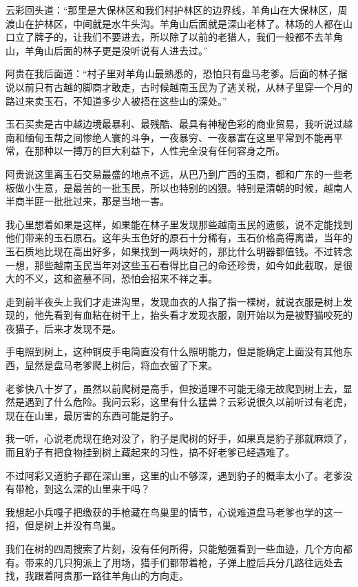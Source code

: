 云彩回头道：“那里是大保林区和我们村护林区的边界线，羊角山在大保林区，周渡山在护林区，中间就是水牛头沟。羊角山后面就是深山老林了。林场的人都在山口立了牌子的，让我们不要进去，所以除了以前的老猎人，我们一般都不去羊角山，羊角山后面的林子更是没听说有人进去过。”

阿贵在我后面道：“村子里对羊角山最熟悉的，恐怕只有盘马老爹。后面的林子据说以前只有古越的脚商才敢走，古时候越南玉民为了逃关税，从林子里穿一个月的路过来卖玉石，不知道多少人被捂在这些山的深处。”

玉石买卖是古中越边境最暴利、最残酷、最具有神秘色彩的商业贸易，我听说过越南和缅甸玉帮之间惨绝人寰的斗争，一夜暴穷、一夜暴富在这里平常到不能再平常，在那种以一搏万的巨大利益下，人性完全没有任何容身之所。

阿贵说这里离玉石交易最盛的地点不远，从巴乃到广西的玉商，都和广东的一些老板做小生意，是最苦的一批玉民，所以也特别的凶狠。特别是清朝的时候，越南人半商半匪一批批过来，那是当地一害。

我心里想着如果是这样，如果能在林子里发现那些越南玉民的遗骸，说不定能找到他们带来的玉石原石。这年头玉色好的原石十分稀有，玉石价格高得离谱，当年的玉石质地比现在高出好多，如果找到一两块好的，那比什么明器都值钱。不过转念一想，那些越南玉民当年对这些玉石看得比自己的命还珍贵，如今如此截取，是很大的不义，这和盗墓不同，恐怕会招来不祥之事。

走到前半夜头上我们才走进沟里，发现血衣的人指了指一棵树，就说衣服是树上发现的，他先看到有血粘在树干上，抬头看才发现衣服，刚开始以为是被野猫咬死的夜猫子，后来才发现不是。

手电照到树上，这种铜皮手电简直没有什么照明能力，但是能确定上面没有其他东西，显然是盘马老爹爬上树后，将血衣留了下来。

老爹快八十岁了，虽然以前爬树是高手，但按道理不可能无缘无故爬到树上去，显然是遇到了什么危险。我问云彩，这里有什么猛兽？云彩说很久以前听过有老虎，现在在山里，最厉害的东西可能是豹子。

我一听，心说老虎现在绝对没了，豹子是爬树的好手，如果真是豹子那就麻烦了，而且豹子有把食物挂到树上藏起来的习性，搞不好老爹已经遇难了。

不过阿彩又道豹子都在深山里，这里的山不够深，遇到豹子的概率太小了。老爹没有带枪，到这么深的山里来干吗？

我想起小兵嘎子把缴获的手枪藏在鸟巢里的情节，心说难道盘马老爹也学的这一招，但是树上并没有鸟巢。

我们在树的四周搜索了片刻，没有任何所得，只能勉强看到一些血迹，几个方向都有。带来的几只狗派上了用场，猎手们都带着枪，子弹上膛后兵分几路往远处去找，我跟着阿贵那一路往羊角山的方向走。

